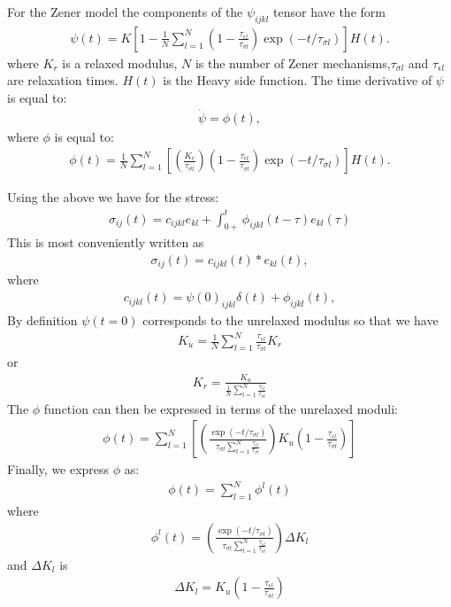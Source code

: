 \documentclass[11pt]{article}
\begin{document}
For the Zener model the components of the $\psi_{ijkl}$ tensor have the form
\begin{eqnarray}
  \psi(t)=K\left[1-\frac{1}{N}\sum_{l=1}^N 
            (1-\frac{\tau_{\epsilon l}}{\tau_{\sigma l}})\exp(-t/\tau_{\sigma l})\right]H(t).
\end{eqnarray}
%
where $K_r$ is a relaxed modulus, $N$ is the number of Zener mechanisms,$\tau_{\sigma l}$
and $\tau_{\epsilon l}$ are relaxation times. $H(t)$ is the Heavy side function.
The time derivative of $\psi$ is equal to:
\begin{eqnarray}
\dot{\psi} = \phi(t),
\end{eqnarray}
where $\phi$ is equal to:
\begin{eqnarray}
\phi(t)=
  \frac{1}{N}\sum_{l=1}^N\left[\left(\frac{K_r}{\tau_{\sigma l}}\right) 
            \left(1-\frac{\tau_{\epsilon l}}{\tau_{\sigma l}}\right)\exp(-t/\tau_{\sigma l})\right]H(t).
                \label{eq:phi}
\end{eqnarray}

Using the above we have for the stress:
\begin{eqnarray}
\sigma_{ij}(t)=c_{ijkl}e_{kl} +\int_{0+}^t \phi_{ijkl}(t-\tau)e_{kl}(\tau)
\end{eqnarray}
This is most conveniently written as
\begin{eqnarray}
\sigma_{ij}(t)=c_{ijkl}(t)*e_{kl}(t),
\end{eqnarray}
where
\begin{eqnarray}
 c_{ijkl}(t)=\psi(0)_{ijkl}\delta(t) +\phi_{ijkl}(t),
\end{eqnarray}
%
By definition $\psi(t=0)$ corresponds to the unrelaxed modulus so that we have
\begin{eqnarray}
K_u = \frac{1}{N}\sum_{l=1}^N \frac{\tau_{\epsilon l}}{\tau_{\sigma l}} K_r
\end{eqnarray}
or
\begin{eqnarray}
K_r = \frac{K_u}{\frac{1}{N}\sum_{l=1}^N \frac{\tau_{\epsilon l}}{\tau_{\sigma l}}}
\end{eqnarray}
The $\phi$ function can then be expressed in terms of the unrelaxed moduli:
\begin{eqnarray}
\phi(t) =   
  \sum_{l=1}^N\left[\left(\frac{\exp(-t/\tau_{\sigma l})}{\tau_{\sigma l}\sum_{l=1}^N \frac{\tau_{\epsilon l}}{\tau_{\sigma l}}}\right)
            K_u\left(1-\frac{\tau_{\epsilon l}}{\tau_{\sigma l}}\right)\right]
\end{eqnarray}
Finally, we express $\phi$ as:
\begin{eqnarray}
\phi(t) = \sum_{l=1}^N \phi^l(t)
\end{eqnarray}
where
\begin{eqnarray}
\phi^l(t) = 
  \left(\frac{\exp(-t/\tau_{\sigma l})}{\tau_{\sigma l}\sum_{l=1}^N \frac{\tau_{\epsilon l}}{\tau_{\sigma l}}}\right)
            \Delta K_l
\end{eqnarray}
and $\Delta K_l$ is
\begin{eqnarray}
\Delta K_l = K_u\left(1-\frac{\tau_{\epsilon l}}{\tau_{\sigma l}}\right)
\end{eqnarray}
\end{document}
